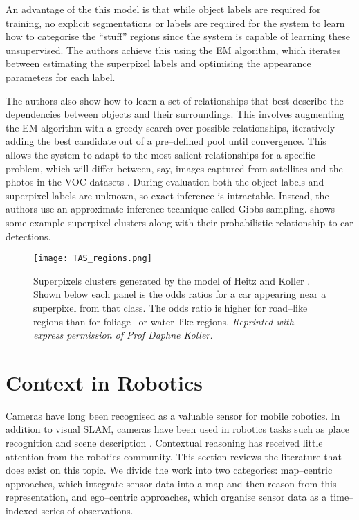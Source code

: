 An advantage of the this model is that while object labels are
required for training, no explicit segmentations or labels are
required for the system to learn how to categorise the ``stuff''
regions since the system is capable of learning these
unsupervised. The authors achieve this using the EM algorithm, which
iterates between estimating the superpixel labels and optimising the
appearance parameters for each label.

The authors also show how to learn a set of relationships that best
describe the dependencies between objects and their surroundings. This
involves augmenting the EM algorithm with a greedy search over
possible relationships, iteratively adding the best candidate out of a
pre--defined pool until convergence. This allows the system to adapt
to the most salient relationships for a specific problem, which will
differ between, say, images captured from satellites and the photos in
the VOC datasets \cite{VOC2009}. During evaluation both the object
labels and superpixel labels are unknown, so exact inference is
intractable. Instead, the authors use an approximate inference
technique called Gibbs sampling.   shows some
example superpixel clusters along with their probabilistic
relationship to car detections.

\begin{figure}[tb]
  \centering
  \texttt{[image: TAS\_regions.png]}
  \caption{Superpixels clusters generated by the model of Heitz and
    Koller \cite{Heitz08}. Shown below each panel is the odds ratios for
    a car appearing near a superpixel from that class. The odds ratio is
    higher for road--like regions than for foliage-- or water--like
    regions.
    \textit{Reprinted with express permission of Prof Daphne Koller.}
    }
  \label{fig:TAS-regions}
\end{figure}

\section{Context in Robotics}
Cameras have long been recognised as a valuable sensor for mobile
robotics. In addition to visual SLAM, cameras have been used in
robotics tasks such as place recognition \cite{Cummins08} and scene
description \cite{Posner08}. Contextual reasoning has received little
attention from the robotics community. This section reviews the
literature that does exist on this topic. We divide the work into two
categories: map--centric approaches, which integrate sensor data into
a map and then reason from this representation, and ego--centric
approaches, which organise sensor data as a time--indexed series of
observations.

